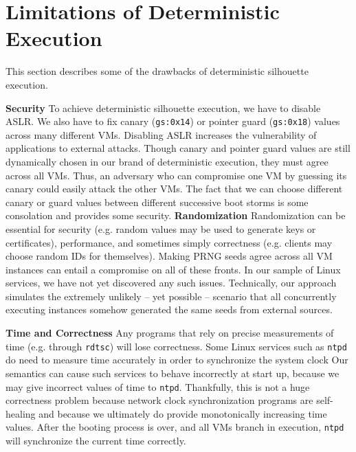 \section{Limitations of Deterministic Execution} \label{ch3:issues}
This section describes some of the drawbacks
of deterministic silhouette execution. \newline

\noindent \textbf{Security} \newline
To achieve deterministic silhouette execution,
we have to disable ASLR. We also have to fix 
canary (\texttt{gs:0x14}) or pointer guard (\texttt{gs:0x18})
values across many different VMs.
Disabling ASLR increases the vulnerability of
applications to external attacks. 
Though canary and pointer guard
values are still dynamically chosen in
our brand of deterministic execution, 
they must agree across all VMs. Thus,
an adversary  who can compromise one VM by
guessing its canary could easily attack the other VMs.
The fact that we can choose different
canary or guard values between different successive boot storms
is some consolation and provides some security. \newline
\newpage
\noindent \textbf{Randomization} \newline
Randomization can be essential for security (e.g. random values
may be used to generate keys or certificates),
performance, and sometimes simply correctness (e.g. 
clients may choose random IDs for themselves).
Making PRNG seeds agree across all VM instances can entail
a compromise on all of these fronts.
In our sample of Linux services, we have not yet discovered any such
issues. Technically,
our approach simulates the extremely unlikely 
-- yet possible -- scenario that all concurrently executing
instances somehow generated the same seeds
from external sources. \newline

\noindent \textbf{Time and Correctness} \newline
Any programs that rely on precise
measurements of time (e.g. through \texttt{rdtsc})
will lose correctness. 
Some Linux services such as \texttt{ntpd} 
do need to measure time accurately in order to synchronize the system clock
Our semantics can cause such services to 
behave incorrectly at start up,
because we may give incorrect values
of time to \texttt{ntpd}.
Thankfully, this is not a huge correctness problem because network 
clock synchronization programs are self-healing and
because we ultimately do provide monotonically
increasing time values. After the booting process is over,
and all VMs branch in execution, \texttt{ntpd} will synchronize
the current time correctly. \newline

